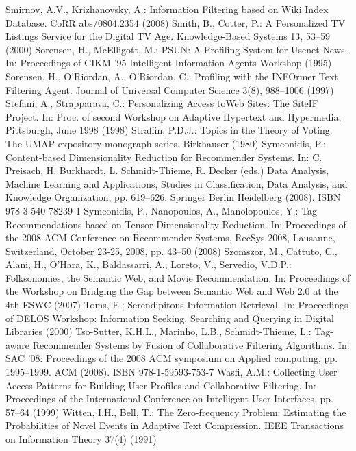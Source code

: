 \begin{thebibliography}{110}
Smirnov, A.V., Krizhanovsky, A.: Information Filtering based on Wiki Index Database. CoRR abs/0804.2354 (2008)
Smith, B., Cotter, P.: A Personalized TV Listings Service for the Digital TV Age. Knowledge-Based Systems 13, 53–59 (2000)
Sorensen, H., McElligott, M.: PSUN: A Profiling System for Usenet News. In: Proceedings of CIKM ’95 Intelligent Information Agents Workshop (1995)
Sorensen, H., O’Riordan, A., O’Riordan, C.: Profiling with the INFOrmer Text Filtering Agent. Journal of Universal Computer Science 3(8), 988–1006 (1997)
Stefani, A., Strapparava, C.: Personalizing Access toWeb Sites: The SiteIF Project. In: Proc. of second Workshop on Adaptive Hypertext and Hypermedia, Pittsburgh, June 1998 (1998)
Straffin, P.D.J.: Topics in the Theory of Voting. The UMAP expository monograph series. Birkhauser (1980)
Symeonidis, P.: Content-based Dimensionality Reduction for Recommender Systems. In: C. Preisach, H. Burkhardt, L. Schmidt-Thieme, R. Decker (eds.) Data Analysis, Machine Learning and Applications, Studies in Classification, Data Analysis, and Knowledge Organization, pp. 619–626. Springer Berlin Heidelberg (2008). ISBN 978-3-540-78239-1
Symeonidis, P., Nanopoulos, A., Manolopoulos, Y.: Tag Recommendations based on Tensor Dimensionality Reduction. In: Proceedings of the 2008 ACM Conference on Recommender Systems, RecSys 2008, Lausanne, Switzerland, October 23-25, 2008, pp. 43–50 (2008)
Szomszor, M., Cattuto, C., Alani, H., O’Hara, K., Baldassarri, A., Loreto, V., Servedio, V.D.P.: Folksonomies, the Semantic Web, and Movie Recommendation. In: Proceedings of the Workshop on Bridging the Gap between Semantic Web and Web 2.0 at the 4th ESWC (2007)
Toms, E.: Serendipitous Information Retrieval. In: Proceedings of DELOS Workshop: Information Seeking, Searching and Querying in Digital Libraries (2000)
Tso-Sutter, K.H.L., Marinho, L.B., Schmidt-Thieme, L.: Tag-aware Recommender Systems by Fusion of Collaborative Filtering Algorithms. In: SAC ’08: Proceedings of the 2008 ACM symposium on Applied computing, pp. 1995–1999. ACM (2008). ISBN 978-1-59593-753-7
Wasfi, A.M.: Collecting User Access Patterns for Building User Profiles and Collaborative Filtering. In: Proceedings of the International Conference on Intelligent User Interfaces, pp. 57–64 (1999)
Witten, I.H., Bell, T.: The Zero-frequency Problem: Estimating the Probabilities of Novel Events in Adaptive Text Compression. IEEE Transactions on Information Theory 37(4) (1991)

\end{thebibliography}
